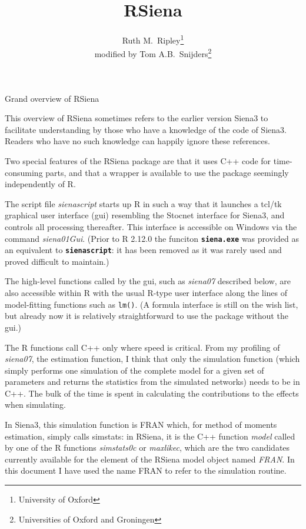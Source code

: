 \documentclass[12pt,a4paper]{article}
\makeatletter
\renewcommand{\=}{\,=\,}
\newcommand{\+}{\,+\,}
\newcommand{\nm}[1]{\textsf{ #1}}
\newcommand{\nnm}[1]{\textsf{\textit{#1}}}
\renewcommand{\section}{\@startsection{section}{1}
                {0pt}{\baselineskip}{0.5\baselineskip}
                {\centering\sffamily} }
\newcommand{\sfn}[1]{\textbf{\texttt{#1}}}
\newcommand{\R}{{\sf R }}
\newcommand{\Rn}{{\sf R}}
\newcommand{\rs}{{\sf RSiena}}
\newcommand{\RS}{{\sf RSiena }}
\newcommand{\SI}{{\sf Siena3 }}
\newcommand{\Sn}{{\sf Siena3}}
\makeatother
\begin{document}

\title{RSiena}
\author{Ruth M.\ Ripley\footnote{University of Oxford}\\
modified by Tom A.B.\ Snijders\footnote{Universities of Oxford and Groningen}}
\maketitle
\date{}


\section{Grand overview of  RSiena}

This overview of \RS sometimes refers to the earlier version \SI to
facilitate understanding by those who have a knowledge
of the code of \Sn. Readers who have no such knowledge
can happily ignore these references.

Two special features of the \RS package are that it uses C++ code for
time-consuming parts, and that a wrapper is available to use the package
seemingly independently of \Rn.

The script file \nnm{sienascript} starts up \R in such a way that it launches a
tcl/tk graphical user interface (gui) resembling the Stocnet interface for \Sn,
and controls all processing thereafter. This interface is accessible on Windows
via the command \nnm{siena01Gui}. (Prior to R 2.12.0 the funciton
\sfn{siena.exe} was provided as an equivalent to \sfn{sienascript}: it has been
removed as it was rarely used and proved difficult to maintain.)

The high-level functions called by the gui, such as \nnm{siena07} described
below, are also accessible within \R with the usual \Rn-type user interface
along the lines of model-fitting functions such as \verb|lm()|. (A formula
interface is still on the wish list, but already now it is relatively
straightforward to use the package without the gui.)

The \R functions call C++ only where speed is critical. From my profiling of
\nnm{siena07}, the estimation function, I think that only the simulation
function (which simply performs one simulation of the complete model for a given
set of parameters and returns the statistics from the simulated networks) needs
to be in C++. The bulk of the time is spent in calculating the contributions to
the effects when simulating.

In \Sn, this simulation function is \nm{FRAN} which, for method of moments
estimation, simply calls \nm{simstats}: in \rs, it is the C++ function
\nnm{model} called by one of the \R functions \nnm{simstats0c} or
\nnm{maxlikec}, which are the two candidates currently available for the element
of the \RS model object named \nnm{FRAN}. In this document I have used the name
\nm{FRAN} to refer to the simulation routine.
\end{document}

